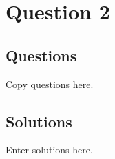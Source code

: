 \chapter{Question 2}
\section{Questions}
Copy questions here.

\section{Solutions}
Enter solutions here.
